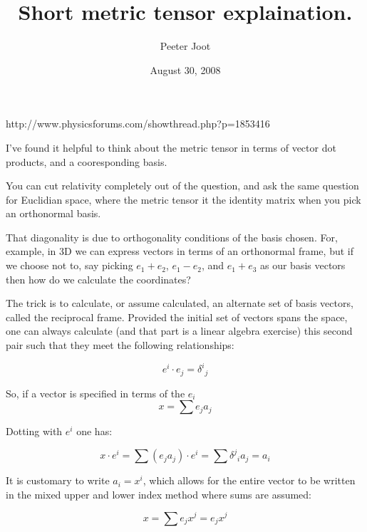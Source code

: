 \documentclass{article}      %
\title{Short metric tensor explaination.} %
\author{Peeter Joot}         %
\date{August 30, 2008}        %
\begin{document}

\maketitle{}

\section{}

http://www.physicsforums.com/showthread.php?p=1853416

I've found it helpful to think about the metric tensor in terms of vector dot products, and a cooresponding basis.  

You can cut relativity completely out of the question, and ask the same question for Euclidian space, where the metric tensor it the identity matrix when you pick an orthonormal basis.

That diagonality is due to orthogonality conditions of the basis chosen.  For, example, in 3D we can express vectors in terms of an
orthonormal frame, but if we choose not to, say picking $e_1 + e_2$, $e_1-e_2$, and $e_1 + e_3$ as our basis vectors then how do we calculate the coordinates?

The trick is to calculate, or assume calculated, an alternate set of basis vectors, called the reciprocal frame.  Provided the initial set of vectors spans the space, one can always calculate (and that part is a linear algebra exercise) this second pair such that they meet the following relationships:

\begin{equation*}
e^i \cdot e_j = {\delta^i}_j
\end{equation*}

So, if a vector is specified in terms of the $e_i$
\begin{equation*}
x = \sum e_j a_j
\end{equation*}

Dotting with $e^i$ one has:

\begin{equation*}
x \cdot e^i = \sum (e_j a_j) \cdot e^i = \sum {\delta^j}_i a_j = a_i
\end{equation*}

It is customary to write $a_i = x^i$, which allows for the entire vector to
be written in the mixed upper and lower index method where sums are assumed:

\begin{equation*}
x = \sum e_j x^j = e_j x^j
\end{equation*}
\end{document}
